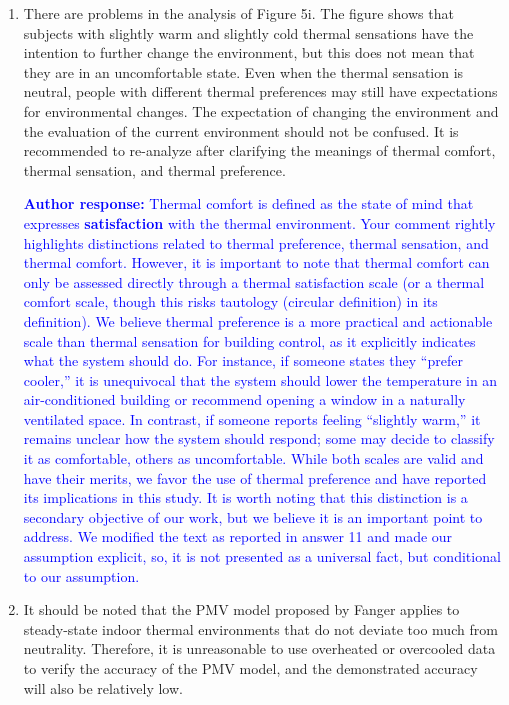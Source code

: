 \documentclass[a4paper, 10pt]{letter}
\newcommand{\response}[1]{\textcolor{blue}{\textbf{Author response:} #1}}
\begin{document}
\begin{letter}
\begin{enumerate}
            \item There are problems in the analysis of Figure 5i.
            The figure shows that subjects with slightly warm and slightly cold thermal sensations have the intention to further change the environment, but this does not mean that they are in an uncomfortable state.
            Even when the thermal sensation is neutral, people with different thermal preferences may still have expectations for environmental changes.
            The expectation of changing the environment and the evaluation of the current environment should not be confused.
            It is recommended to re-analyze after clarifying the meanings of thermal comfort, thermal sensation, and thermal preference.

            \response{Thermal comfort is defined as the state of mind that expresses \textbf{satisfaction} with the thermal environment. 
            Your comment rightly highlights distinctions related to thermal preference, thermal sensation, and thermal comfort. 
            However, it is important to note that thermal comfort can only be assessed directly through a thermal satisfaction scale (or a thermal comfort scale, though this risks tautology (circular definition) in its definition). 
            We believe thermal preference is a more practical and actionable scale than thermal sensation for building control, as it explicitly indicates what the system should do. 
            For instance, if someone states they “prefer cooler,” it is unequivocal that the system should lower the temperature in an air-conditioned building or recommend opening a window in a naturally ventilated space. 
            In contrast, if someone reports feeling “slightly warm,” it remains unclear how the system should respond; some may decide to classify it as comfortable, others as uncomfortable. 
            While both scales are valid and have their merits, we favor the use of thermal preference and have reported its implications in this study. 
            It is worth noting that this distinction is a secondary objective of our work, but we believe it is an important point to address. 
            We modified the text as reported in answer 11 and made our assumption explicit, so, it is not presented as a universal fact, but conditional to our assumption.}

            \item It should be noted that the PMV model proposed by Fanger applies to steady-state indoor thermal environments that do not deviate too much from neutrality.
            Therefore, it is unreasonable to use overheated or overcooled data to verify the accuracy of the PMV model, and the demonstrated accuracy will also be relatively low.


\end{enumerate}
\end{letter}
\end{document}
